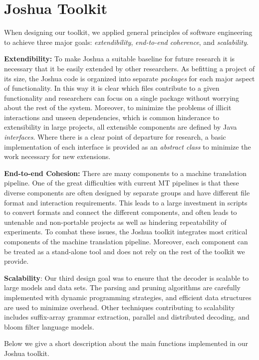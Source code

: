 \documentclass[11pt]{article}
\begin{document}
\section{Joshua Toolkit}
When designing our toolkit,  we applied general principles of software engineering to achieve three major goals: \emph{extendibility}, \emph{end-to-end coherence}, and \emph{scalability}.

\textbf{Extendibility:} To make Joshua a suitable baseline for future research it is necessary that it be easily extended by other researchers. As befitting a project of its size, the Joshua code is organized into separate \emph{packages} for each major aspect of functionality. In this way it is clear which files contribute to a given functionality and researchers can focus on a single package without worrying about the rest of the system. Moreover, to minimize the problems of illicit interactions and unseen dependencies, which is common hinderance to extensibility in large projects, all extensible components are defined by Java \emph{interfaces}. Where there is a clear point of departure for research, a basic implementation of each interface is provided as an \emph{abstract class} to minimize the work necessary for new extensions.

\textbf{End-to-end Cohesion:} There are many components to a machine translation pipeline. One of the great difficulties with current MT pipelines is that these diverse components are often designed by separate groups and have different file format and interaction requirements. This leads to a large investment in scripts to convert formats and connect the different components, and often leads to untenable and non-portable projects as well as hindering repeatability of experiments.
To combat these issues, the Joshua toolkit integrates most critical components of the machine translation pipeline. Moreover, each component can be treated as a stand-alone tool and does not rely on the rest of the toolkit we provide.

\textbf{Scalability}: Our third design goal was to ensure that the decoder is scalable to large models and data sets. The parsing and pruning algorithms are carefully implemented with dynamic programming strategies, and efficient data structures are used to minimize overhead. Other techniques contributing to scalability includes suffix-array grammar extraction, parallel and distributed decoding, and bloom filter language models.

Below we give a short description about the main functions implemented in our Joshua toolkit.
\end{document}

